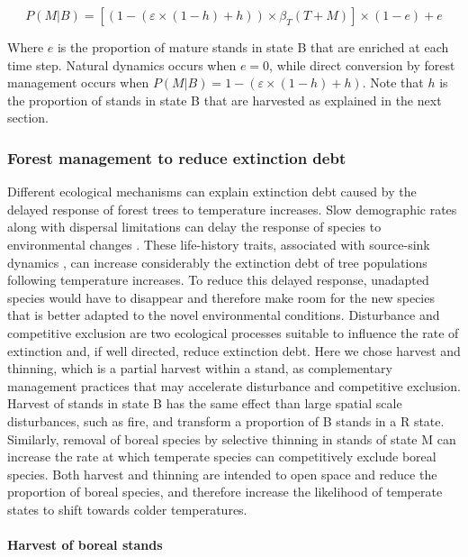 \[
P(M|B) = [(1- (\varepsilon \times (1 - h) + h)) \times \beta_T(T + M)] \times (1-e) + e
\]

Where \(e\) is the proportion of mature stands in state B that are
enriched at each time step. Natural dynamics occurs when \(e=0\), while
direct conversion by forest management occurs when
\(P(M|B)= 1- (\varepsilon \times (1 - h) + h)\). Note that \(h\) is the
proportion of stands in state B that are harvested as explained in the
next section.

\hypertarget{forest-management-to-reduce-extinction-debt}{%
\subsubsection{Forest management to reduce extinction
debt}\label{forest-management-to-reduce-extinction-debt}}

Different ecological mechanisms can explain extinction debt caused by
the delayed response of forest trees to temperature increases. Slow
demographic rates along with dispersal limitations can delay the
response of species to environmental changes \citep{Dullinger2012}.
These life-history traits, associated with source-sink dynamics
\citep{Schurr2012}, can increase considerably the extinction debt of
tree populations following temperature increases. To reduce this delayed
response, unadapted species would have to disappear and therefore make
room for the new species that is better adapted to the novel
environmental conditions. Disturbance and competitive exclusion are two
ecological processes suitable to influence the rate of extinction and,
if well directed, reduce extinction debt. Here we chose harvest and
thinning, which is a partial harvest within a stand, as complementary
management practices that may accelerate disturbance and competitive
exclusion. Harvest of stands in state B has the same effect than large
spatial scale disturbances, such as fire, and transform a proportion of
B stands in a R state. Similarly, removal of boreal species by selective
thinning in stands of state M can increase the rate at which temperate
species can competitively exclude boreal species. Both harvest and
thinning are intended to open space and reduce the proportion of boreal
species, and therefore increase the likelihood of temperate states to
shift towards colder temperatures.

\hypertarget{harvest-of-boreal-stands}{%
\paragraph{Harvest of boreal stands}\label{harvest-of-boreal-stands}}

